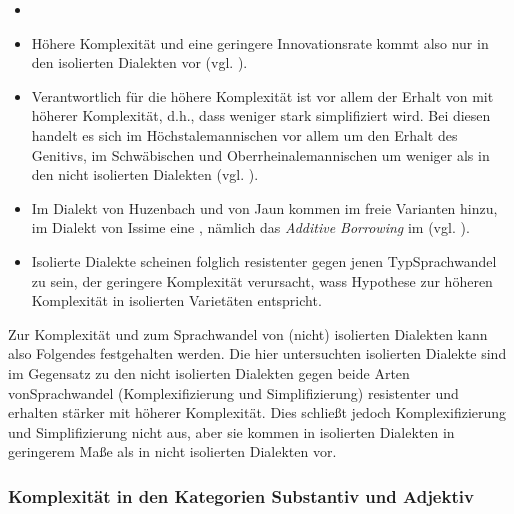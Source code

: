 \begin{description}
\begin{itemize}
\item[]
\item
Höhere Komplexität und eine geringere Innovationsrate kommt also nur in den isolierten Dialekten vor (vgl. ).
\item
Verantwortlich für die höhere Komplexität ist vor allem der Erhalt von  mit höherer Komplexität, d.h., dass weniger stark simplifiziert wird. Bei diesen  handelt es sich im Höchstalemannischen vor allem um den Erhalt des Genitivs, im Schwäbischen und Oberrheinalemannischen um weniger  als in den nicht isolierten Dialekten (vgl. ).
\item
Im Dialekt von Huzenbach und von Jaun kommen im  freie Varianten hinzu, im Dialekt von Issime eine , nämlich das \textit{Additive Borrowing} im  (vgl. ).
\item
Isolierte Dialekte scheinen folglich resistenter gegen jenen Typ\linebreak Sprachwandel zu sein, der geringere Komplexität verursacht, was\linebreak \citeauthor{Trudgill2011}s \citeyearpar{Trudgill2011} Hypothese zur höheren Komplexität in isolierten Varietäten entspricht.
\end{itemize}
\end{description}

Zur Komplexität und zum Sprachwandel von (nicht) isolierten Dialekten kann also Folgendes festgehalten werden. Die hier untersuchten isolierten Dialekte sind im Gegensatz zu den nicht isolierten Dialekten gegen beide Arten von\linebreak Sprachwandel (Komplexifizierung und Simplifizierung) resistenter und erhalten stärker  mit höherer Komplexität. Dies schließt jedoch Komplexifizierung und Simplifizierung nicht aus, aber sie kommen in isolierten Dialekten in geringerem Maße als in nicht isolierten Dialekten vor.

\subsubsection{Komplexität in den Kategorien Substantiv und Adjektiv}

